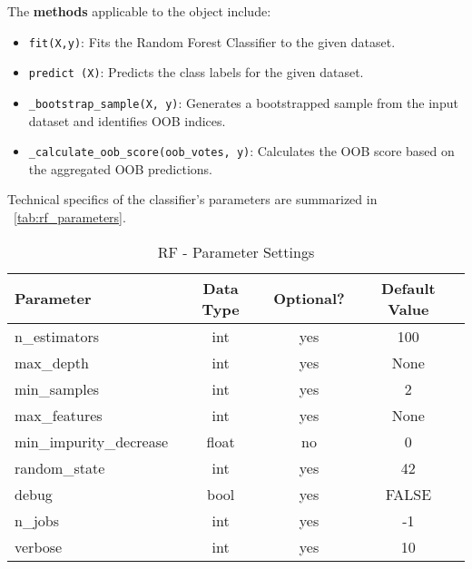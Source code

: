 \begin{appendices}
  The \textbf{methods} applicable to the object include:
  \begin{itemize}
    \item \texttt{fit(X,y)}: Fits the Random Forest Classifier to the given dataset.
    \item \texttt{predict (X)}: Predicts the class labels for the given dataset.
    \item \texttt{\_bootstrap\_sample(X, y)}: Generates a bootstrapped sample from the input dataset and identifies OOB indices.
    \item \texttt{\_calculate\_oob\_score(oob\_votes, y)}: Calculates the OOB score based on the aggregated OOB predictions.
  \end{itemize}

  Technical specifics of the classifier's parameters are summarized in ~\autoref{tab:rf_parameters}.

  \begin{table}[H]
    \centering
    \begin{tabular}{lccc}
      \toprule
      \textbf{Parameter}      & \textbf{Data Type} & \textbf{Optional?} & \textbf{Default Value} \\
      \midrule
      n\_estimators           & int                & yes                & 100                    \\
      max\_depth              & int                & yes                & None                   \\
      min\_samples            & int                & yes                & 2                      \\
      max\_features           & int                & yes                & None                   \\
      min\_impurity\_decrease & float              & no                 & 0                      \\
      random\_state           & int                & yes                & 42                     \\
      debug                   & bool               & yes                & FALSE                  \\
      n\_jobs                 & int                & yes                & -1                     \\
      verbose                 & int                & yes                & 10                     \\
      \bottomrule
    \end{tabular}
    \caption{RF - Parameter Settings}
    \label{tab:rf_parameters}
  \end{table}



\end{appendices}
